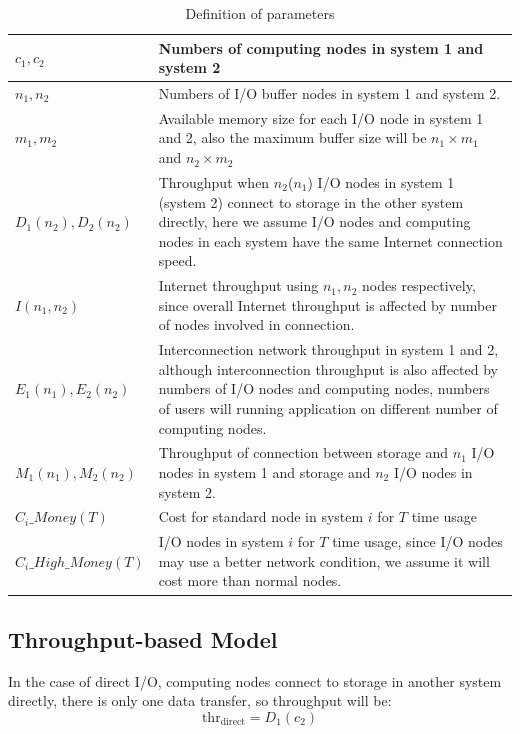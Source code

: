 \begin{table}[tb]
	\caption{Definition of parameters}
	\label{definition}
\begin{tabular}{|p{3cm}|p{5cm}|}
	\hline
	$c_1,c_2$&Numbers of computing nodes in system 1 and system 2\\\hline
	$n_1, n_2$&Numbers of I/O buffer nodes in system 1 and system 2.\\\hline
	$m_1,m_2$&Available memory size for each I/O node in system 1 and 2, also the maximum buffer size will be $n_1\times m_1$ and $n_2\times m_2$\\\hline
	$D_1(n_2),D_2(n_2)$&Throughput when $n_2$($n_1$) I/O nodes in system 1 (system 2) connect to storage in the other system directly, here we assume I/O nodes and computing nodes in each system have the same Internet connection speed.\\\hline%
	$I(n_1,n_2)$& 	Internet throughput using $n_1,n_2$ nodes respectively, since overall Internet throughput is affected by number of nodes involved in connection.\\\hline
	$E_1(n_1), E_2(n_2)$&Interconnection network throughput in system 1 and 2, although interconnection throughput is also affected by numbers of I/O nodes and computing nodes, numbers of users will running application on different number of computing nodes.\\\hline
	$M_1(n_1),M_2(n_2)$& Throughput of connection between storage and $n_1$ I/O nodes in system 1 and storage and $n_2$ I/O nodes in system 2.\\\hline
	$C_i\_Money(T)$& Cost for standard node in system $i$ for $T$ time usage\\\hline
	$C_i\_High\_Money(T)$ &I/O nodes in system $i$ for $T$ time usage, since I/O nodes may use a better network condition, we assume it will cost more than normal nodes.\\\hline
\end{tabular}
\end{table}

\subsection{Throughput-based Model}
In the case of direct I/O, computing nodes connect to storage in another system directly, there is only one data transfer, so throughput will be:%
\begin{equation}
	\text{thr}_{\text{direct}}=D_1(c_2) \label{throughput1}
\end{equation}

